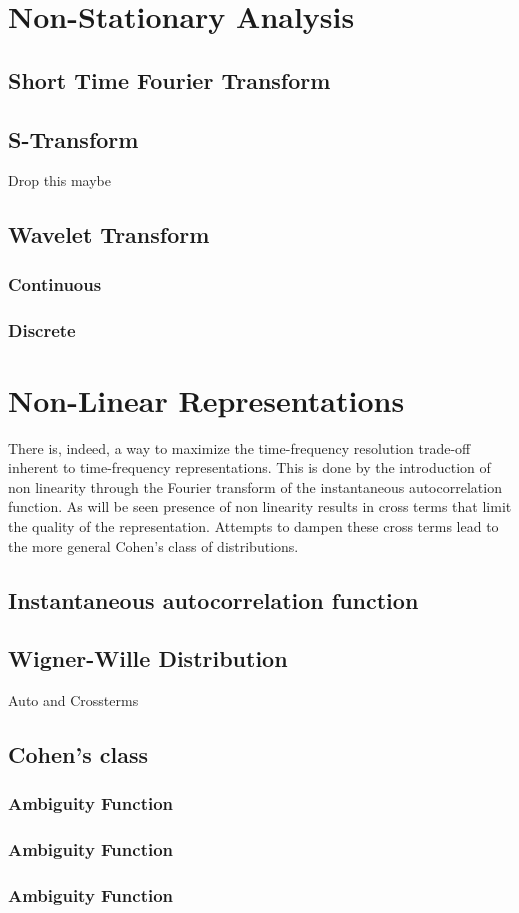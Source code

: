 \section{Non-Stationary Analysis}

\subsection{Short Time Fourier Transform}

\subsection{S-Transform}

Drop this maybe

\subsection{Wavelet Transform}

\subsubsection{Continuous}

\subsubsection{Discrete}

\section{Non-Linear Representations}

There is, indeed, a way to maximize the time-frequency resolution trade-off
inherent to time-frequency representations\cite{HERE BRO}. This is done by the introduction
of non linearity through the Fourier transform of the instantaneous
autocorrelation function. As will be seen presence of non linearity results in
cross terms that limit the quality of the representation. Attempts to dampen
these cross terms lead to the more general Cohen's class of distributions.

\subsection{Instantaneous autocorrelation function}

\subsection{Wigner-Wille Distribution}

Auto and Crossterms

\subsection{Cohen's class}

\subsubsection{Ambiguity Function}

\subsubsection{Ambiguity Function}

\subsubsection{Ambiguity Function}
